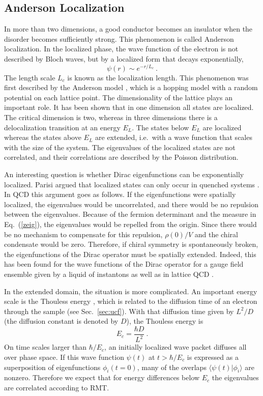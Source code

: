 \subsection{Anderson Localization}
\label{sec:anderson}

In more than two dimensions, a good conductor becomes an insulator
when the disorder becomes sufficiently strong. This phenomenon is
called Anderson localization.  In the localized phase, the wave
function of the electron is not described by Bloch waves, but by a
localized form that decays exponentially,
\begin{equation}
  \psi(r) \sim e^{-  r/{L_c}}\:.
\end{equation}
The length scale $L_c$ is known as the localization length.  This
phenomenon was first described by the Anderson model \cite{Ande58},
which is a hopping model with a random potential on each lattice
point. The dimensionality of the lattice plays an important role.  It
has been shown that in one dimension all states are localized. The
critical dimension is two, whereas in three dimensions there is a
delocalization 
transition at an energy $E_L$. The states below $E_L$ are localized
whereas the states above $E_L$ are extended, i.e.\ with a wave
function that scales with the size of the system.  The eigenvalues of
the localized states are not correlated, and their correlations are
described by the Poisson distribution.

An interesting question is whether Dirac eigenfunctions can be
exponentially localized. Parisi argued that localized
states can only occur in quenched systems \cite{Parisi}.  In QCD this
argument goes as follows.  If the eigenfunctions were spatially
localized, the eigenvalues would be uncorrelated, and there would be
no repulsion between the eigenvalues.  Because of the fermion
determinant and the measure in Eq.~(\ref{zeig}), the eigenvalues would
be repelled from the origin.  Since there would be no mechanism to
compensate for this repulsion, $\rho(0)/V$ and the chiral condensate
would be zero. Therefore, if chiral symmetry is spontaneously broken,
the eigenfunctions of the Dirac operator must be spatially extended.
Indeed, this has been found for the wave functions of the Dirac
operator for a gauge field ensemble given by a liquid of instantons
\cite{Osbo98a} as well as in lattice QCD \cite{Berb00}.

In the extended domain, the situation is more complicated. An important
energy scale is the Thouless energy \cite{Thou74}, which is related to
the diffusion time of an electron through the sample (see
Sec.~\ref{sec:ucf}). With that diffusion time given by $L^2/D$ (the
diffusion constant is denoted by $D$), the Thouless energy is
\cite{Altshuler}
\begin{equation}
  E_c = \frac{\hbar D}{L^2}\:.
\end{equation}
On time scales larger than $\hbar/E_c$, an initially localized wave
packet diffuses all over phase space.  If this wave function $\psi(t)$
at $t>\hbar/E_c$ is expressed as a superposition of eigenfunctions
$\phi_i(t=0)$, many of the overlaps $\langle\psi(t)|\phi_i\rangle$ are
nonzero.  Therefore we expect that for energy differences below $E_c$
the eigenvalues are correlated according to RMT.


